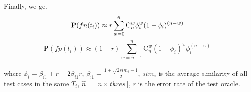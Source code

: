 Finally, we get
\begin{equation}
\mathbf{P}(fn(t_i)) \approx r \sum_{w = 0}^{\hat{n}}{\mathrm{C}_n^w{\phi_i^w (1-\phi_i)^{(n-w)}}} \\
\end{equation}
\begin{equation}
\mathbf{P}(fp(t_i)) \approx (1 - r) \sum_{w = \hat{n} + 1}^{n} \mathrm{C}_n^w{(1 - \phi_i)^w} \phi_i^{(n-w)}
\end{equation}

where $\phi_i = \beta_{i1} + r - 2 \beta_{i1} r$, $\beta_{i1} = \frac{1 + \sqrt{2 {sim}_i - 1}}{2}$,
${sim}_i$ is the average similarity of all test cases in the same $T_i$, $\hat{n} = \lfloor n \times thres \rfloor$, $r$ is the error rate of the test oracle.
